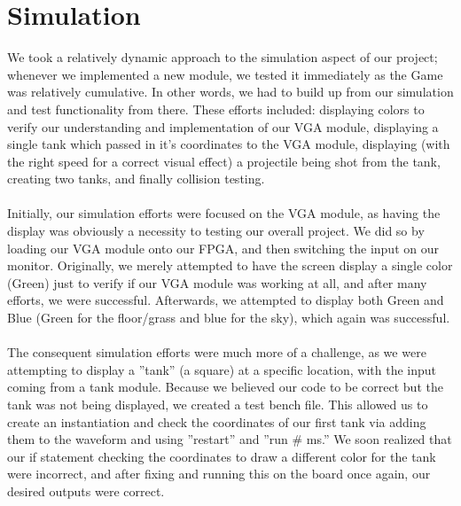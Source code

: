 \documentclass{article}
\begin{document}

\section*{Simulation}


We took a relatively dynamic approach to the simulation aspect of our project; whenever we implemented a new module, we tested it immediately as the Game was relatively cumulative.  In other words, we had to build up from our simulation and test functionality from there.  These efforts included: displaying colors to verify our understanding and implementation of our VGA module, displaying a single tank which passed in it's coordinates to the VGA module, displaying (with the right speed for a correct visual effect) a projectile being shot from the tank, creating two tanks, and finally collision testing.  
 \\
 \\
Initially, our simulation efforts were focused on the VGA module, as having the display was obviously a necessity to testing our overall project.  We did so by loading our VGA module onto our FPGA, and then switching the input on our monitor.  Originally, we merely attempted to have the screen display a single color (Green) just to verify if our VGA module was working at all, and after many efforts, we were successful.  Afterwards, we attempted to display both Green and Blue (Green for the floor/grass and blue for the sky), which again was successful.
\\
\\
The consequent simulation efforts were much more of a challenge, as we were attempting to display a ''tank'' (a square) at a specific location, with the input coming from a tank module.  Because we believed our code to be correct but the tank was not being displayed, we created a test bench file.  This allowed us to create an instantiation and check the coordinates of our first tank via adding them to the waveform and using ''restart'' and ''run \# ms.''  We soon realized that our if statement checking the coordinates to draw a different color for the tank were incorrect, and after fixing and running this on the board once again, our desired outputs were correct.
\end{document}
